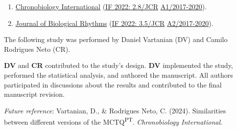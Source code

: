 \documentclass[
12pt,
openright,
oneside,
a4paper,
chapter=TITLE,
section=TITLE,
french,
spanish,
brazil,
english
]{abntex2}\usepackage{array}
\newcommand{\microskip}{\vspace{\microskipamount}}
\begin{document}
\begin{tcolorbox}[enhanced jigsaw, arc=.35mm, toprule=.15mm, opacitybacktitle=0.6, rightrule=.15mm, opacityback=0, colframe=quarto-callout-note-color-frame, titlerule=0mm, colback=white, toptitle=1mm, coltitle=black, left=2mm, colbacktitle=quarto-callout-note-color!10!white, title=\textcolor{quarto-callout-note-color}{\faInfo}\hspace{0.5em}{Target journal}, bottomrule=.15mm, breakable, bottomtitle=1mm, leftrule=.75mm]

\begin{enumerate}
\def\labelenumi{\arabic{enumi}.}
\tightlist
\item
  \href{https://www.tandfonline.com/action/authorSubmission?show=instructions&journalCode=icbi20}{Chronobiology
  International} (\href{https://jcr.clarivate.com/jcr/}{IF 2022:
  2.8/JCR} \textbar{}
  \href{https://sucupira.capes.gov.br/sucupira/public/consultas/coleta/veiculoPublicacaoQualis/listaConsultaGeralPeriodicos.jsf}{A1/2017-2020}).
\item
  \href{https://journals.sagepub.com/author-instructions/JBR}{Journal of
  Biological Rhythms} (\href{https://jcr.clarivate.com/jcr/}{IF 2022:
  3.5/JCR} \textbar{}
  \href{https://sucupira.capes.gov.br/sucupira/public/consultas/coleta/veiculoPublicacaoQualis/listaConsultaGeralPeriodicos.jsf}{A2/2017-2020}).
\end{enumerate}

\end{tcolorbox}

\begin{tcolorbox}[enhanced jigsaw, arc=.35mm, toprule=.15mm, opacitybacktitle=0.6, rightrule=.15mm, opacityback=0, colframe=quarto-callout-note-color-frame, titlerule=0mm, colback=white, toptitle=1mm, coltitle=black, left=2mm, colbacktitle=quarto-callout-note-color!10!white, title=\textcolor{quarto-callout-note-color}{\faInfo}\hspace{0.5em}{Note}, bottomrule=.15mm, breakable, bottomtitle=1mm, leftrule=.75mm]

The following study was performed by Daniel Vartanian (DV) and Camilo
Rodrigues Neto (CR).

\microskip

\textbf{DV} and \textbf{CR} contributed to the study's design.
\textbf{DV} implemented the study, performed the statistical analysis,
and authored the manuscript. All authors participated in discussions
about the results and contributed to the final manuscript revision.

\microskip

\emph{Future reference}: Vartanian, D., \& Rodrigues Neto, C. (2024).
Similarities between different versions of the MCTQ\textsuperscript{PT}.
\emph{Chronobiology International}.

\end{tcolorbox}
\end{document}
